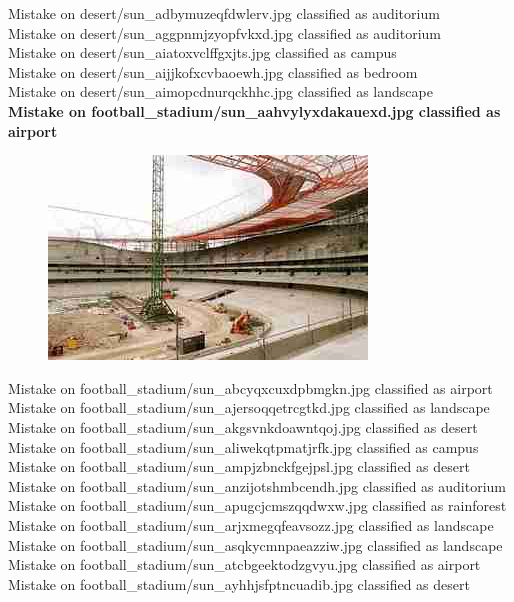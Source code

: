 \documentclass[12pt]{article}
\begin{document}
Mistake on desert/sun\_adbymuzeqfdwlerv.jpg classified as auditorium \\
Mistake on desert/sun\_aggpnmjzyopfvkxd.jpg classified as auditorium \\
Mistake on desert/sun\_aiatoxvclffgxjts.jpg classified as campus \\
Mistake on desert/sun\_aijjkofxcvbaoewh.jpg classified as bedroom \\
Mistake on desert/sun\_aimopcdnurqckhhc.jpg classified as landscape \\
{\bf Mistake on football\_stadium/sun\_aahvylyxdakauexd.jpg classified as airport \\}
\begin{figure}
\centering
\includegraphics[width=0.5\linewidth]{../dat/football_stadium/sun_aahvylyxdakauexd.jpg}
\end{figure}
Mistake on football\_stadium/sun\_abcyqxcuxdpbmgkn.jpg classified as airport \\
Mistake on football\_stadium/sun\_ajersoqqetrcgtkd.jpg classified as landscape \\
Mistake on football\_stadium/sun\_akgsvnkdoawntqoj.jpg classified as desert \\
Mistake on football\_stadium/sun\_aliwekqtpmatjrfk.jpg classified as campus \\
Mistake on football\_stadium/sun\_ampjzbnckfgejpsl.jpg classified as desert \\
Mistake on football\_stadium/sun\_anzijotshmbcendh.jpg classified as auditorium \\
Mistake on football\_stadium/sun\_apugcjcmszqqdwxw.jpg classified as rainforest \\
Mistake on football\_stadium/sun\_arjxmegqfeavsozz.jpg classified as landscape \\
Mistake on football\_stadium/sun\_asqkycmnpaeazziw.jpg classified as landscape \\
Mistake on football\_stadium/sun\_atcbgeektodzgvyu.jpg classified as airport \\
Mistake on football\_stadium/sun\_ayhhjsfptncuadib.jpg classified as desert \\
\end{document}
